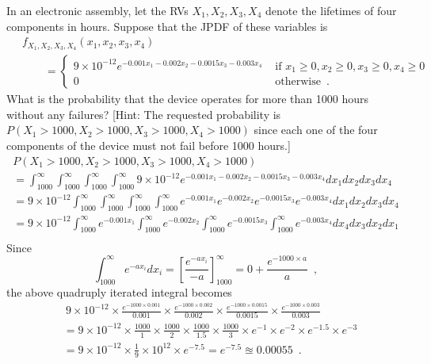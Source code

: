 \begin{ExerciseList}
\Exercise
In an electronic assembly, let the RVs $X_1,X_2,X_3,X_4$ denote the lifetimes of four components in hours.  
Suppose that the JPDF of these variables is
\begin{align*}
~& f_{X_1,X_2,X_3,X_4}(x_1,x_2,x_3,x_4) \\
&\qquad= 
\begin{cases}
9 \times 10^{-12} e^{-0.001 x_1 - 0.002 x_2 - 0.0015 x_3 - 0.003 x_4} & \text{ if } x_1 \geq 0, x_2 \geq 0, x_3 \geq 0, x_4 \geq 0\\
0 & \text{ otherwise} \enspace.
\end{cases}
\end{align*}
What is the probability that the device operates for more than 1000 hours without any failures? [Hint: The requested probability is $P(X_1>1000,X_2>1000,X_3>1000,X_4>1000)$ since each one of the four components of the device must not fail before 1000 hours.]
\Answer
~\\
\begin{multline*}
P(X_1>1000,X_2>1000,X_3>1000,X_4>1000) \\
= \int_{1000}^{\infty} \int_{1000}^{\infty} \int_{1000}^{\infty} \int_{1000}^{\infty} 9 \times 10^{-12} e^{-0.001 x_1 - 0.002 x_2 - 0.0015 x_3 - 0.003 x_4} dx_1 dx_2 dx_3 dx_4\\
= 9 \times 10^{-12} \int_{1000}^{\infty} \int_{1000}^{\infty} \int_{1000}^{\infty} \int_{1000}^{\infty}  e^{-0.001 x_1} e^{- 0.002 x_2} e^{- 0.0015 x_3} e^{- 0.003 x_4} dx_1 dx_2 dx_3 dx_4\\
=  9 \times 10^{-12} \int_{1000}^{\infty} e^{-0.001 x_1} \int_{1000}^{\infty} e^{- 0.002 x_2} \int_{1000}^{\infty} e^{- 0.0015 x_3} \int_{1000}^{\infty} e^{- 0.003 x_4} dx_4 dx_3 dx_2 dx_1\\
\end{multline*}
Since
\[
\int_{1000}^{\infty} e^{- a x_i} dx_i = \left[ \frac{e^{-a x_i}}{-a} \right]_{1000}^{\infty} = 0 + \frac{e^{-1000\times a}}{a} \enspace ,
\]
the above quadruply iterated integral becomes
\begin{align*}
&~ 9 \times 10^{-12} \times \frac{e^{-1000 \times 0.001}}{0.001} \times \frac{e^{-1000 \times 0.002}}{0.002} 
\times \frac{e^{-1000 \times 0.0015}}{0.0015} \times \frac{e^{-1000 \times 0.003}}{0.003}\\
&= 9 \times 10^{-12} \times \frac{1000}{1} \times \frac{1000}{2} \times \frac{1000}{1.5} \times \frac{1000}{3} \times
e^{-1} \times e^{-2} \times e^{-1.5} \times e^{-3} \\
&= 9 \times 10^{-12} \times \frac{1}{9} \times 10^{12} \times e^{-7.5} = e^{-7.5} \approxeq 0.00055 \enspace .
\end{align*}


\end{ExerciseList}
